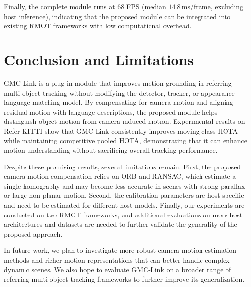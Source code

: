 \documentclass[sigconf,anonymous,nonacm]{acmart}
\begin{document}
Finally, the complete module runs at $68$ FPS (median $14.8$\,ms/frame, excluding host inference), indicating that the proposed module can be integrated into existing RMOT frameworks with low computational overhead.

\section{Conclusion and Limitations}
\label{sec:conclusion}
GMC-Link is a plug-in module that improves motion grounding in referring multi-object tracking without modifying the detector, tracker, or appearance-language matching model. By compensating for camera motion and aligning residual motion with language descriptions, the proposed module helps distinguish object motion from camera-induced motion. Experimental results on Refer-KITTI show that GMC-Link consistently improves moving-class HOTA while maintaining competitive pooled HOTA, demonstrating that it can enhance motion understanding without sacrificing overall tracking performance.

Despite these promising results, several limitations remain. First, the proposed camera motion compensation relies on ORB and RANSAC, which estimate a single homography and may become less accurate in scenes with strong parallax or large non-planar motion. Second, the calibration parameters are host-specific and need to be estimated for different host models. Finally, our experiments are conducted on two RMOT frameworks, and additional evaluations on more host architectures and datasets are needed to further validate the generality of the proposed approach.

In future work, we plan to investigate more robust camera motion estimation methods and richer motion representations that can better handle complex dynamic scenes. We also hope to evaluate GMC-Link on a broader range of referring multi-object tracking frameworks to further improve its generalization.



\end{document}
